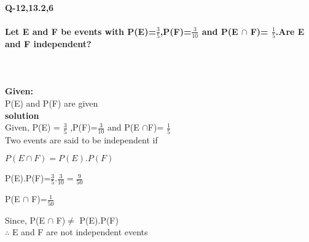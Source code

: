 \documentclass[10pt, a4paper]{article}
\title{\mytitle}
\author{\myauthor\hspace{1em} \\\contact\\FWC22094\hspace{6.5em}IITH\hspace{0.5em}\mymodule\hspace{6em}Module 2}
\date{}
\begin{document}
\maketitle
\paragraph*{\large Q-12,13.2,6}
\paragraph*{\large  Let E and F be events with P(E)=$\frac{3}{5}$,P(F)=$\frac{3}{10}$ and P(E $\cap $ F)= $\frac{1}{5}$.Are E and F independent?}
\hspace{15mm}\\
\\
\noindent \textbf{Given:} \\
P(E) and P(F) are given\\
\textbf{solution}\\
Given, P(E) = $\frac{3}{5}$ ,P(F)=$\frac{3}{10}$  and P(E $\cap $F)= $\frac{1}{5}$
\\
Two events are said to be independent if\\
\begin{center}
$P(E \cap F) =P(E).P(F)$ 
\end{center}
\begin{center}
P(E).P(F)=$\frac{3}{5}.\frac{3}{10}=\frac{9}{50}$
\end{center}
\begin{center}
P(E $\cap $ F)=$\frac{1}{50}$
\end{center}
\begin{center}
Since, P(E $\cap $ F)$\neq$ P(E).P(F)\\
$\therefore$ E and F are not independent events
\end{center}
\vspace{10mm}
\end{document}
